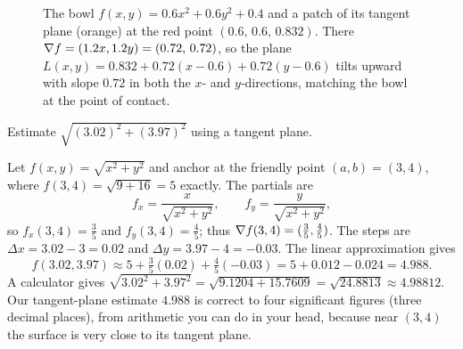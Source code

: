 \begin{figure}[H]
\centering
{}
\caption{The bowl $f(x,y)=0.6x^2+0.6y^2+0.4$ and a patch of its tangent plane
(orange) at the red point $(0.6,\,0.6,\,0.832)$. There $\nabla f=(1.2x,1.2y)=(0.72,\,0.72)$,
so the plane $L(x,y)=0.832+0.72(x-0.6)+0.72(y-0.6)$ tilts upward with slope $0.72$
in both the $x$- and $y$-directions, matching the bowl at the point of contact.}
\label{ch33:fig-plane}
\end{figure}

\begin{example}
\label{ch33:ex-linapprox}
Estimate $\sqrt{(3.02)^2 + (3.97)^2}$ using a tangent plane.

Let $f(x,y)=\sqrt{x^2+y^2}$ and anchor at the friendly point $(a,b)=(3,4)$, where
$f(3,4)=\sqrt{9+16}=5$ exactly. The partials are
\[
  f_x = \frac{x}{\sqrt{x^2+y^2}}, \qquad f_y = \frac{y}{\sqrt{x^2+y^2}},
\]
so $f_x(3,4)=\tfrac35$ and $f_y(3,4)=\tfrac45$; thus $\nabla f(3,4)=(\tfrac35,
\tfrac45)$. The steps are $\Delta x = 3.02-3 = 0.02$ and
$\Delta y = 3.97-4 = -0.03$. The linear approximation gives
\[
  f(3.02,3.97)\approx 5 + \tfrac35(0.02) + \tfrac45(-0.03)
  = 5 + 0.012 - 0.024 = 4.988.
\]
A calculator gives $\sqrt{3.02^2+3.97^2}=\sqrt{9.1204+15.7609}=\sqrt{24.8813}
\approx 4.98812$. Our tangent-plane estimate $4.988$ is correct to four significant figures (three decimal places),
from arithmetic you can do in your head, because near $(3,4)$ the surface is
very close to its tangent plane.
\end{example}

